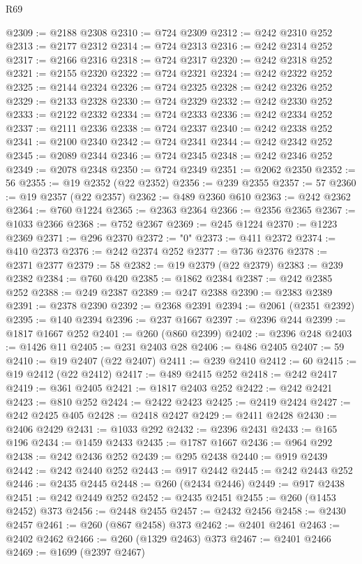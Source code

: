 \begin{lexlean}{R69}
\begin{coremodule}
{@2309 := @2188 @2308
@2310 := @724 @2309
@2312 := @242 @2310 @252
@2313 := @2177 @2312
@2314 := @724 @2313
@2316 := @242 @2314 @252
@2317 := @2166 @2316
@2318 := @724 @2317
@2320 := @242 @2318 @252
@2321 := @2155 @2320
@2322 := @724 @2321
@2324 := @242 @2322 @252
@2325 := @2144 @2324
@2326 := @724 @2325
@2328 := @242 @2326 @252
@2329 := @2133 @2328
@2330 := @724 @2329
@2332 := @242 @2330 @252
@2333 := @2122 @2332
@2334 := @724 @2333
@2336 := @242 @2334 @252
@2337 := @2111 @2336
@2338 := @724 @2337
@2340 := @242 @2338 @252
@2341 := @2100 @2340
@2342 := @724 @2341
@2344 := @242 @2342 @252
@2345 := @2089 @2344
@2346 := @724 @2345
@2348 := @242 @2346 @252
@2349 := @2078 @2348
@2350 := @724 @2349
@2351 := @2062 @2350
@2352 := 56
@2355 := @19 @2352 (@22 @2352)
@2356 := @239 @2355
@2357 := 57
@2360 := @19 @2357 (@22 @2357)
@2362 := @489 @2360 @610
@2363 := @242 @2362
@2364 := @760 @1224
@2365 := @2363 @2364
@2366 := @2356 @2365
@2367 := @1033 @2366
@2368 := @752 @2367
@2369 := @245 @1224
@2370 := @1223 @2369
@2371 := @296 @2370
@2372 := "0"
@2373 := @411 @2372
@2374 := @410 @2373
@2376 := @242 @2374 @252
@2377 := @736 @2376
@2378 := @2371 @2377
@2379 := 58
@2382 := @19 @2379 (@22 @2379)
@2383 := @239 @2382
@2384 := @760 @420
@2385 := @1862 @2384
@2387 := @242 @2385 @252
@2388 := @249 @2387
@2389 := @247 @2388
@2390 := @2383 @2389
@2391 := @2378 @2390
@2392 := @2368 @2391
@2394 := @2061 (@2351 @2392)
@2395 := @140 @2394
@2396 := @237 @1667
@2397 := @2396 @244
@2399 := @1817 @1667 @252
@2401 := @260 (@860 @2399)
@2402 := @2396 @248
@2403 := @1426 @11
@2405 := @231 @2403 @28
@2406 := @486 @2405
@2407 := 59
@2410 := @19 @2407 (@22 @2407)
@2411 := @239 @2410
@2412 := 60
@2415 := @19 @2412 (@22 @2412)
@2417 := @489 @2415 @252
@2418 := @242 @2417
@2419 := @361 @2405
@2421 := @1817 @2403 @252
@2422 := @242 @2421
@2423 := @810 @252
@2424 := @2422 @2423
@2425 := @2419 @2424
@2427 := @242 @2425 @405
@2428 := @2418 @2427
@2429 := @2411 @2428
@2430 := @2406 @2429
@2431 := @1033 @292
@2432 := @2396 @2431
@2433 := @165 @196
@2434 := @1459 @2433
@2435 := @1787 @1667
@2436 := @964 @292
@2438 := @242 @2436 @252
@2439 := @295 @2438
@2440 := @919 @2439
@2442 := @242 @2440 @252
@2443 := @917 @2442
@2445 := @242 @2443 @252
@2446 := @2435 @2445
@2448 := @260 (@2434 @2446)
@2449 := @917 @2438
@2451 := @242 @2449 @252
@2452 := @2435 @2451
@2455 := @260 (@1453 @2452) @373
@2456 := @2448 @2455
@2457 := @2432 @2456
@2458 := @2430 @2457
@2461 := @260 (@867 @2458) @373
@2462 := @2401 @2461
@2463 := @2402 @2462
@2466 := @260 (@1329 @2463) @373
@2467 := @2401 @2466
@2469 := @1699 (@2397 @2467)
}
\end{coremodule}
\end{lexlean}
